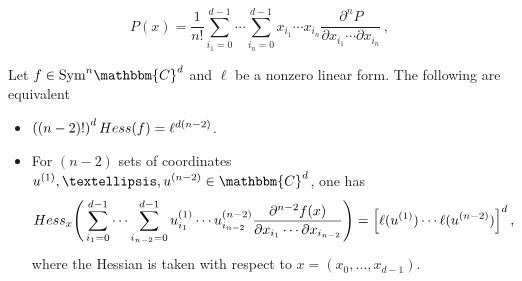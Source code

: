 \documentclass[10pt,a4paper]{amsart}
\def\Hess{{\rm Hess}}
\begin{document}
\begin{equation}\label{eq:polfull}
P(x) = \frac{1}{n!}\sum_{i_1=0}^{d-1}\cdots\sum_{i_n=0}^{d-1}
x_{i_1}\cdots x_{i_n}\frac{\partial^n P}{\partial x_{i_1}\cdots \partial x_{i_n}}\,,
\end{equation}

\begin{proposition}\label{prop:aaprime}
Let $f\in \mathrm{Sym}^n\mathbbm{C}^d$ and $\ell$ be a nonzero linear form.  The following are equivalent
\begin{itemize}
\item[$(\textnormal{a})$] $\left((n-2)!\right)^d\Hess(f)=\ell^{d(n-2)}$.
\item[$(\textnormal{a}^{\prime})$] For $(n-2)$ sets of coordinates $u^{(1)},\ldots, u^{(n-2)}\in\mathbbm{C}^d$, one has
\begin{equation}\label{eq:hessxl}
\Hess_x\Bigg(\sum_{i_1=0}^{d-1}\cdots\sum_{i_{n-2}=0}^{d-1} u^{(1)}_{i_1}\cdots u^{(n-2)}_{i_{n-2}}
\frac{\partial^{n-2}f(x)}{\partial x_{i_1}\cdots\partial {x_{i_{n-2}}}}\Bigg) = \Big[\ell(u^{(1)})\cdots \ell(u^{(n-2)})\Big]^d\,,
\end{equation}
 where the Hessian is taken with respect to $x=(x_0,\ldots, x_{d-1})$.
\end{itemize}
\end{proposition}
\end{document}
